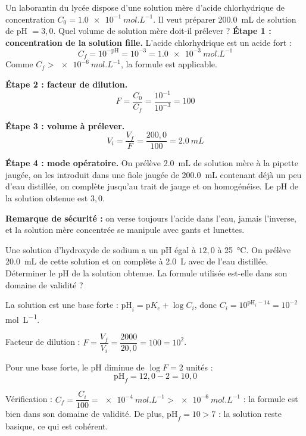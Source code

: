 \documentclass[11pt]{article}
\begin{document}
\begin{exoresolu}[Préparation de 200 mL de solution de pH = 3]
Un laborantin du lycée dispose d'une solution mère d'acide chlorhydrique de concentration $C_0 = \SI{1,0e-1}{mol.L^{-1}}$. Il veut préparer \SI{200,0}{mL} de solution de pH $= 3{,}0$. Quel volume de solution mère doit-il prélever ?
\tcblower
\textbf{Étape 1 : concentration de la solution fille.} L'acide chlorhydrique est un acide fort :
\[ C_f = 10^{-\mathrm{pH}} = 10^{-3} = \SI{1,0e-3}{mol.L^{-1}} \]
Comme $C_f > \SI{e-6}{mol.L^{-1}}$, la formule est applicable.

\textbf{Étape 2 : facteur de dilution.}
\[ F = \dfrac{C_0}{C_f} = \dfrac{10^{-1}}{10^{-3}} = 100 \]

\textbf{Étape 3 : volume à prélever.}
\[ V_i = \dfrac{V_f}{F} = \dfrac{200{,}0}{100} = \SI{2,0}{mL} \]

\textbf{Étape 4 : mode opératoire.} On prélève \SI{2,0}{mL} de solution mère à la pipette jaugée, on les introduit dans une fiole jaugée de \SI{200,0}{mL} contenant déjà un peu d'eau distillée, on complète jusqu'au trait de jauge et on homogénéise. Le pH de la solution obtenue est $3{,}0$.

\textbf{Remarque de sécurité :} on verse toujours l'acide dans l'eau, jamais l'inverse, et la solution mère concentrée se manipule avec gants et lunettes.
\end{exoresolu}

\begin{exercice}
Une solution d'hydroxyde de sodium a un pH égal à $12{,}0$ à \SI{25}{\celsius}. On prélève \SI{20,0}{mL} de cette solution et on complète à \SI{2,0}{L} avec de l'eau distillée. Déterminer le pH de la solution obtenue. La formule utilisée est-elle dans son domaine de validité ?
\end{exercice}

\begin{corrige}[Exercice 1]
La solution est une base forte : $\mathrm{pH}_i = \mathrm{p}K_e + \log C_i$, donc $C_i = 10^{\mathrm{pH}_i - 14} = 10^{-2}$ \si{mol.L^{-1}}.

Facteur de dilution : $F = \dfrac{V_f}{V_i} = \dfrac{2000}{20{,}0} = 100 = 10^{2}$.

Pour une base forte, le pH diminue de $\log F = 2$ unités :
\[ \mathrm{pH}_f = 12{,}0 - 2 = 10{,}0 \]

Vérification : $C_f = \dfrac{C_i}{100} = \SI{e-4}{mol.L^{-1}} > \SI{e-6}{mol.L^{-1}}$ : la formule est bien dans son domaine de validité. De plus, $\mathrm{pH}_f = 10 > 7$ : la solution reste basique, ce qui est cohérent.
\end{corrige}
\end{document}
